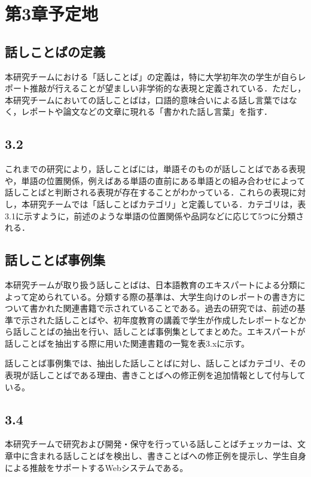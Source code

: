 \chapter{第3章予定地\label{c3}}


\section{話しことばの定義 \label{c3s1}}
本研究チームにおける「話しことば」の定義は，特に大学初年次の学生が自らレポート推敲が行えることが望ましい非学術的な表現と定義されている．ただし，本研究チームにおいての話しことばは，口語的意味合いによる話し言葉ではなく，レポートや論文などの文章に現れる「書かれた話し言葉」を指す．

\section{3.2 \label{c3s2}}
これまでの研究により，話しことばには，単語そのものが話しことばである表現や，単語の位置関係，例えばある単語の直前にある単語との組み合わせによって話しことばと判断される表現が存在することがわかっている．これらの表現に対し，本研究チームでは「話しことばカテゴリ」と定義している．カテゴリは，表3.1に示すように，前述のような単語の位置関係や品詞などに応じて5つに分類される．



\section{話しことば事例集 \label{c3s3}}
本研究チームが取り扱う話しことばは、日本語教育のエキスパートによる分類によって定められている。分類する際の基準は、大学生向けのレポートの書き方について書かれた関連書籍で示されていることである。過去の研究では、前述の基準で示された話しことばや、初年度教育の講義で学生が作成したレポートなどから話しことばの抽出を行い、話しことば事例集としてまとめた。エキスパートが話しことばを抽出する際に用いた関連書籍の一覧を表3.xに示す。



話しことば事例集では、抽出した話しことばに対し、話しことばカテゴリ、その表現が話しことばである理由、書きことばへの修正例を追加情報として付与している。



\section{3.4 \label{c3s4}}
本研究チームで研究および開発・保守を行っている話しことばチェッカーは、文章中に含まれる話しことばを検出し、書きことばへの修正例を提示し、学生自身による推敲をサポートするWebシステムである。

